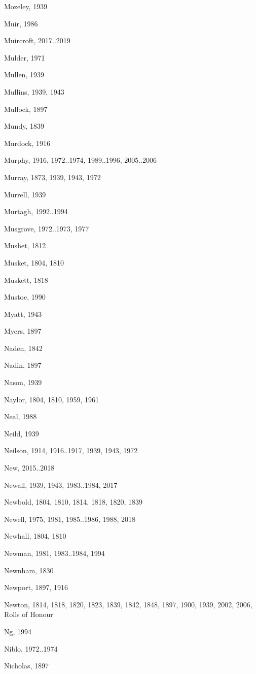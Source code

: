 {\begin{theindex}
\item Mozeley, 1939
\item Muir, 1986
\item Muircroft, 2017..2019
\item Mulder, 1971
\item Mullen, 1939
\item Mullins, 1939, 1943
\item Mullock, 1897
\item Mundy, 1839
\item Murdock, 1916
\item Murphy, 1916, 1972..1974, 1989..1996, 2005..2006
\item Murray, 1873, 1939, 1943, 1972
\item Murrell, 1939
\item Murtagh, 1992..1994
\item Musgrove, 1972..1973, 1977
\item Mushet, 1812
\item Musket, 1804, 1810
\item Muskett, 1818
\item Mustoe, 1990
\item Myatt, 1943
\item Myers, 1897
\item Naden, 1842
\item Nadin, 1897
\item Nason, 1939
\item Naylor, 1804, 1810, 1959, 1961
\item Neal, 1988
\item Neild, 1939
\item Neilson, 1914, 1916..1917, 1939, 1943, 1972
\item New, 2015..2018
\item Newall, 1939, 1943, 1983..1984, 2017
\item Newbold, 1804, 1810, 1814, 1818, 1820, 1839
\item Newell, 1975, 1981, 1985..1986, 1988, 2018
\item Newhall, 1804, 1810
\item Newman, 1981, 1983..1984, 1994
\item Newnham, 1830
\item Newport, 1897, 1916
\item Newton, 1814, 1818, 1820, 1823, 1839, 1842, 1848, 1897, 1900, 1939, 2002, 2006, Rolls of Honour
\item Ng, 1994
\item Niblo, 1972..1974
\item Nicholas, 1897

\end{theindex}}
